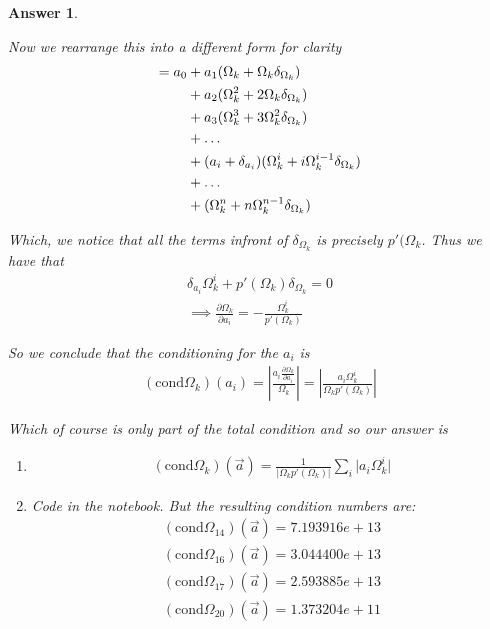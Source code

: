 \documentclass[12pt]{article}
\theoremstyle{colon}
\newtheorem*{answer}{Answer}
\begin{document}
\begin{answer}
\begin{enumerate}[label=\alph*)]
      Now we rearrange this into a different form for clarity
      \begin{align*}
        = a_0 &+ a_1 (\Omega_k + \Omega_k \delta_{\Omega_k}) \\
        &+ a_2 (\Omega_k^2 + 2 \Omega_k \delta_{\Omega_k}) \\
        &+ a_3 (\Omega_k^3 + 3 \Omega_k^2 \delta_{\Omega_k}) \\
        &+ \mathellipsis \\
        &+ (a_i + \delta_{a_i})(\Omega_k^i + i \Omega_k^{i-1} \delta_{\Omega_k}) \\
        &+ \mathellipsis \\
        &+ (\Omega_k^n + n \Omega_k^{n-1} \delta_{\Omega_k})
      \end{align*}

      Which, we notice that all the terms infront of $\delta_{\Omega_k}$ is precisely $p'(\Omega_k$. Thus we have that
      \begin{gather*}
        \delta_{a_i} \Omega_k^i + p'(\Omega_k) \delta_{\Omega_k} = 0 \\
        \implies \frac{\partial \Omega_k}{\partial a_i} = -\frac{\Omega_k^i}{p'(\Omega_k)}
      \end{gather*}

      So we conclude that the conditioning for the $a_i$ is
      \begin{gather*}
        (\text{cond} \Omega_k)(a_i) = \left\lvert \frac{a_i \frac{\partial \Omega_k}{\partial a_i}}{\Omega_k} \right\rvert = \left\rvert \frac{a_i \Omega_k^i}{\Omega_k p'(\Omega_k)} \right\rvert
      \end{gather*}

      Which of course is only part of the total condition and so our answer is

      \begin{enumerate}[label=\roman*)]
        \item
          \begin{gather*}
            (\text{cond} \Omega_k)(\overrightarrow{a}) = \frac{1}{\lvert \Omega_k p'(\Omega_k) \rvert} \sum_i \lvert a_i \Omega_k^i \rvert
          \end{gather*}

        \item Code in the notebook. But the resulting condition numbers are:
          \begin{gather*}
            (\text{cond} \Omega_{14})(\overrightarrow{a}) = 7.193916e+13 \\
            (\text{cond} \Omega_{16})(\overrightarrow{a}) = 3.044400e+13 \\
            (\text{cond} \Omega_{17})(\overrightarrow{a}) = 2.593885e+13 \\
            (\text{cond} \Omega_{20})(\overrightarrow{a}) = 1.373204e+11
          \end{gather*}


\end{enumerate}
\end{enumerate}
\end{answer}
\end{document}
